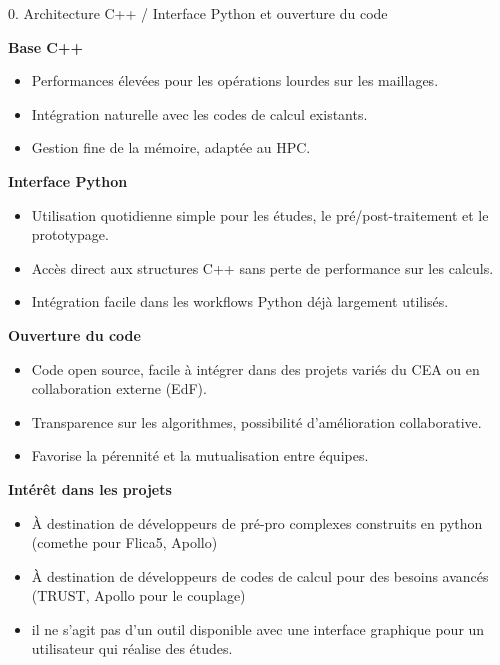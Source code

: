 \begin{frame}{0. Architecture C++ / Interface Python et ouverture du
code}
\protect\hypertarget{architecture-c-interface-python-et-ouverture-du-code}{}
\begin{block}{\textbf{Base C++}}
\protect\hypertarget{base-c}{}
\begin{itemize}
\tightlist
\item
  Performances élevées pour les opérations lourdes sur les maillages.
\item
  Intégration naturelle avec les codes de calcul existants.
\item
  Gestion fine de la mémoire, adaptée au HPC.
\end{itemize}
\end{block}

\begin{block}{\textbf{Interface Python}}
\protect\hypertarget{interface-python}{}
\begin{itemize}
\tightlist
\item
  Utilisation quotidienne simple pour les études, le pré/post-traitement
  et le prototypage.
\item
  Accès direct aux structures C++ sans perte de performance sur les
  calculs.
\item
  Intégration facile dans les workflows Python déjà largement utilisés.
\end{itemize}
\end{block}

\begin{block}{\textbf{Ouverture du code}}
\protect\hypertarget{ouverture-du-code}{}
\begin{itemize}
\tightlist
\item
  Code open source, facile à intégrer dans des projets variés du CEA ou
  en collaboration externe (EdF).
\item
  Transparence sur les algorithmes, possibilité d'amélioration
  collaborative.
\item
  Favorise la pérennité et la mutualisation entre équipes.
\end{itemize}
\end{block}

\begin{block}{\textbf{Intérêt dans les projets}}
\protect\hypertarget{intuxe9ruxeat-dans-les-projets}{}
\begin{itemize}
\tightlist
\item
  À destination de développeurs de pré-pro complexes construits en
  python (comethe pour Flica5, Apollo)
\item
  À destination de développeurs de codes de calcul pour des besoins
  avancés (TRUST, Apollo pour le couplage)
\item
  il ne s'agit pas d'un outil disponible avec une interface graphique
  pour un utilisateur qui réalise des études.
\end{itemize}
\end{block}
\end{frame}

